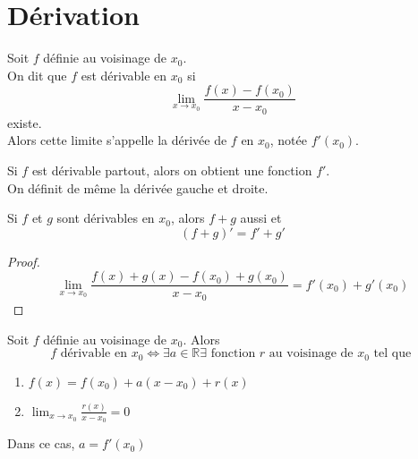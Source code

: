 \documentclass[../main.tex]{subfiles}
\begin{document}
\section{Dérivation}
\begin{defn}
	Soit $f$ définie au voisinage de $x_0$.\\
	On dit que $f$ est dérivable en $x_0$ si
	\[ 
		\lim_{x \to x_0} \frac{f( x) -f( x_0) }{x-x_0}
	\]
	existe.\\
	Alors cette limite s'appelle la dérivée de $f$ en $x_0$, notée $f'( x_0) $.
\end{defn}
\begin{rmq}
Si $f$ est dérivable partout, alors on obtient une fonction $f'$.\\
On définit de même la dérivée gauche et droite.
\end{rmq}
\begin{propo}
Si $f$ et $g$ sont dérivables en $x_0$, alors $f+g$ aussi et
\[ 
	( f+g) ' = f'+g'
\]
\end{propo}
\begin{proof}
\[ 
	\lim_{x \to x_0} \frac{f(x) + g( x) - f( x_0) + g( x_0) }{x-x_0} = f'( x_0) + g'( x_0) 
\]

\end{proof}
\begin{propo}
	Soit $f$ définie au voisinage de $x_0$. Alors 
	\[ 
	f \text{ dérivable en  } x_0 \iff \exists a \in \mathbb{R} \exists \text{ fonction  } r \text{ au voisinage de $x_0$ tel que } 
	\]
	\begin{enumerate}
		\item $f( x) = f( x_0) + a( x-x_0) + r( x) $ 
		\item $\lim_{x \to x_0} \frac{r( x) }{x-x_0}=0$
	\end{enumerate}
	Dans ce cas, $a= f'( x_0) $
	
	
\end{propo}
\end{document}

